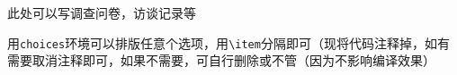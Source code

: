 \Appendix

此处可以写调查问卷，访谈记录等

用\verb|choices|环境可以排版任意个选项，用\verb|\item|分隔即可（现将代码注释掉，如有需要取消注释即可，如果不需要，可自行删除或不管（因为不影响编译效果）



